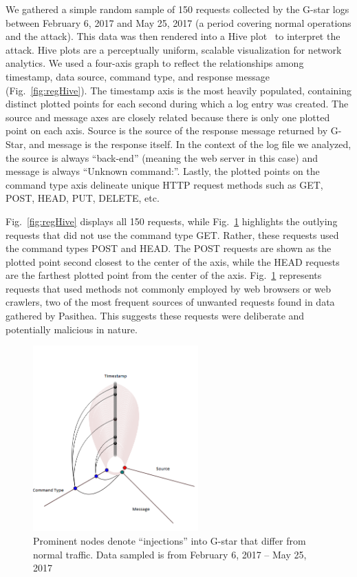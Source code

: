 We gathered a simple random sample of 150 requests collected by the G-star logs between February 6, 2017 and May 25, 2017 (a period covering normal operations and the attack).
This data was then rendered into a Hive plot~\cite{Hive-Plot} to interpret the attack. 
Hive plots are a perceptually uniform, scalable visualization for network analytics.  
We used a four-axis graph to reflect the relationships among timestamp, data source, command type, and response message (Fig.~\ref{fig:regHive}). 
The timestamp axis is the most heavily populated, containing distinct plotted points for each second during which a log entry was created. 
The source and message axes are closely related because there is only one plotted point on each axis. 
Source is the source of the response message returned by G-Star, and message is the response itself. 
In the context of the log file we analyzed, the source is always ``back-end'' (meaning the web server in this case) and message is always ``Unknown command:''. 
Lastly, the plotted points on the command type axis delineate unique HTTP request methods such as GET, POST, HEAD, PUT, DELETE, etc.

Fig.~\ref{fig:regHive} displays all 150 requests, while Fig.~\ref{fig:uniqHive} highlights the outlying requests that did not use the command type GET.  
Rather, these requests used the command types POST and HEAD. 
The POST requests are shown as the plotted point second closest to the center of the axis, while the HEAD requests are the farthest plotted point from the center of the axis. 
Fig.~\ref{fig:uniqHive} represents requests that used methods not commonly employed by web browsers or web crawlers, two of the most frequent sources of unwanted requests found in data gathered by Pasithea. 
This suggests these requests were deliberate and potentially malicious in nature.

\begin{figure}[t]
   \centering
   \includegraphics[width=2.5in]{images/uniqHive.png} 
   \caption{Prominent nodes denote ``injections'' into G-star that differ from normal traffic. Data sampled is from February 6, 2017 -- May 25, 2017}
   \label{fig:uniqHive}
\end{figure}

